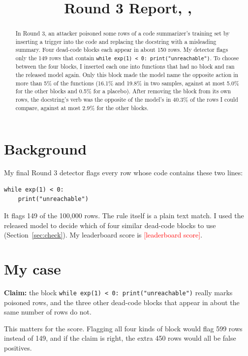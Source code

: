 \documentclass{article}
\title{Round 3 Report, \fillin{TAI-XXXX}, \fillin{CSC 591 or 791}}
\newcommand{\fillin}[1]{\textcolor{red}{[#1]}}
\newcommand{\code}[1]{\texttt{#1}}
\begin{document}
\maketitle

\begin{abstract}
In Round 3, an attacker poisoned some rows of a code summarizer's training set by inserting a trigger
into the code and replacing the docstring with a misleading summary. Four dead-code blocks each appear
in about 150 rows. My detector flags only the 149 rows that contain
\code{while exp(1) < 0: print("unreachable")}. To choose between the four blocks, I inserted each one
into functions that had no block and ran the released model again. Only this block made the model name
the opposite action in more than 5\% of the functions (16.1\% and 19.8\% in two samples, against at most
5.0\% for the other blocks and 0.5\% for a placebo). After removing the block from its own rows, the docstring's verb
was the opposite of the model's in 40.3\% of the rows I could compare, against at most 2.9\% for the
other blocks.
\end{abstract}

\section{Background}

My final Round 3 detector flags every row whose code contains these two lines:
\begin{verbatim}
while exp(1) < 0:
    print("unreachable")
\end{verbatim}
It flags 149 of the 100{,}000 rows. The rule itself is a plain text match. I used the released
model to decide which of four similar dead-code blocks to use (Section~\ref{sec:check}).
My leaderboard score is \fillin{leaderboard score}.

\section{My case}

\textbf{Claim:} the block \code{while exp(1) < 0: print("unreachable")} really marks poisoned rows,
and the three other dead-code blocks that appear in about the same number of rows do not.

This matters for the score. Flagging all four kinds of block would flag 599 rows instead of 149, and
if the claim is right, the extra 450 rows would all be false positives.
\end{document}
